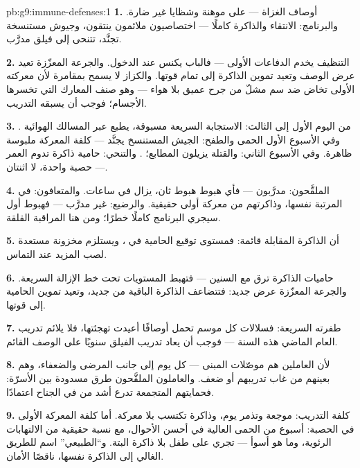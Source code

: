 \begin{solution}{pb:g9:immune-defenses:1}
\textbf{1.} أوصاف الغزاة ---  على  موهنة
وشظايا غير ضارة. والبرنامج: الانتقاء والذاكرة كاملًا ---
اختصاصيون ملائمون ينتقون، وجيوش مستنسخة تجنَّد،  تتنحى إلى فيلق مدرَّب.

\textbf{2.} التنظيف يخدم الدفاعات الأولى --- فالباب يكنس
عند الدخول. والجرعة المعزّزة تعيد عرض الوصف وتعيد تموين
الذاكرة إلى تمام قوتها. والكزاز لا يسمح بمقامرة لأن
معركته الأولى تخاض ضد سم مشلّ من جرح عميق بلا هواء ---
وهو صنف المعارك التي تخسرها الأجسام؛ فوجب أن يسبقه
التدريب.

\textbf{3.} من اليوم الأول إلى الثالث: الاستجابة
السريعة مسبوقة،  يطبع عبر المسالك الهوائية
. وفي الأسبوع الأول الحمى والطفح: الجيش المستنسخ
يجنَّد --- كلفة المعركة ملبوسة ظاهرة. وفي الأسبوع
الثاني:  والقتلة يزيلون المطابع؛
. والتنحي: حامية ذاكرة تدوم العمر --- حصبة
واحدة، لا اثنتان.

\textbf{4.} الملقَّحون: مدرَّبون --- فأي هبوط هبوط ثان،
يزال في ساعات. والمتعافون: في المرتبة نفسها، وذاكرتهم
من معركة أولى حقيقية. والرضيع: غير مدرَّب --- فهبوط أول
سيجري البرنامج كاملًا خطرًا؛ ومن هنا المراقبة القلقة.

\textbf{5.} أن الذاكرة المقابلة قائمة: فمستوى  توقيع الحامية في ، ويستلزم 
مخزونة مستعدة لصب المزيد عند التماس.

\textbf{6.} حاميات الذاكرة ترق مع السنين --- فتهبط
المستويات تحت خط الإزالة السريعة. والجرعة المعزّزة عرض
جديد: فتتضاعف الذاكرة الباقية من جديد، وتعيد تموين
الحامية إلى قوتها.

\textbf{7.} طفرته السريعة: فسلالات كل موسم تحمل أوصافًا
أعيدت تهجئتها، فلا يلائم تدريب العام الماضي  هذه
السنة --- فوجب أن يعاد تدريب الفيلق سنويًا على الوصف
القائم.

\textbf{8.} لأن العاملين هم موصّلات المبنى --- كل يوم
إلى جانب المرضى والضعفاء، وهم بعينهم من غاب تدريبهم أو
ضعف. والعاملون الملقَّحون طرق مسدودة بين الأسرّة:
فحمايتهم المتجمعة تدرع أشد من في الجناح اعتمادًا.

\textbf{9.} كلفة التدريب:  موجعة وتذمر يوم، وذاكرة
تكتسب بلا معركة. أما كلفة المعركة الأولى في الحصبة:
أسبوع من الحمى العالية في أحسن الأحوال، مع نسبة حقيقية
من الالتهابات الرئوية، وما هو أسوأ --- تجري على طفل بلا
ذاكرة البتة. و``الطبيعي'' اسم للطريق الغالي إلى الذاكرة
نفسها، ناقصًا الأمان.


\end{solution}
